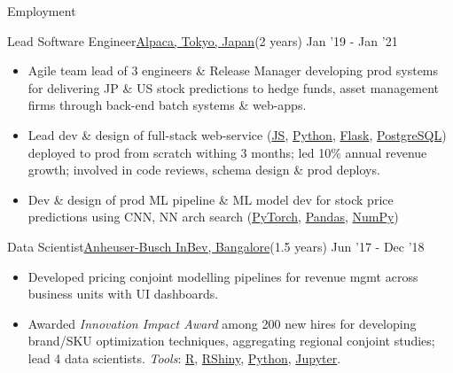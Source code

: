 \documentclass[]{mcdowellcv}
\begin{document}
\begin{cvsection}{Employment}
        \begin{cvsubsection}{Lead Software Engineer}{\href{https://www.alpaca.ai}{Alpaca, Tokyo, Japan}}{(2 years) Jan '19 - Jan '21}
            \begin{itemize}
                \item Agile team lead of 3 engineers \& Release Manager developing prod systems for delivering JP \& US stock predictions to hedge funds, asset management firms through back-end batch systems \& web-apps.
                \item Lead dev \& design of full-stack web-service (\href{https://developer.mozilla.org/en-US/docs/Web/JavaScript}{JS}, \href{https://www.python.org/}{Python}, \href{https://flask.palletsprojects.com/}{Flask}, \href{https://www.postgresql.org/}{PostgreSQL}) deployed to prod from scratch withing 3 months; led 10\% annual revenue growth; involved in code reviews, schema design \& prod deploys.
                \item Dev \& design of prod ML pipeline \& ML model dev for stock price predictions using CNN, NN arch search (\href{https://pytorch.org/}{PyTorch}, \href{https://pandas.pydata.org/}{Pandas}, \href{https://numpy.org/}{NumPy})
            \end{itemize}
        \end{cvsubsection}

        \begin{cvsubsection}{Data Scientist}{\href{https://www.ab-inbev.com/}{Anheuser-Busch InBev, Bangalore}}{(1.5 years) Jun '17 - Dec '18}
            \begin{itemize}
                \item Developed pricing conjoint modelling pipelines for revenue mgmt across business units with UI dashboards.
                \item Awarded \textit{Innovation Impact Award} among 200 new hires for developing brand/SKU optimization techniques, aggregating regional conjoint studies; lead 4 data scientists. \textit{Tools}: \href{https://www.r-project.org/about.html}{R}, \href{https://shiny.rstudio.com/}{RShiny}, \href{https://www.python.org/}{Python}, \href{https://jupyter.org/}{Jupyter}.
            \end{itemize}
        \end{cvsubsection}
    \end{cvsection}
\end{document}
